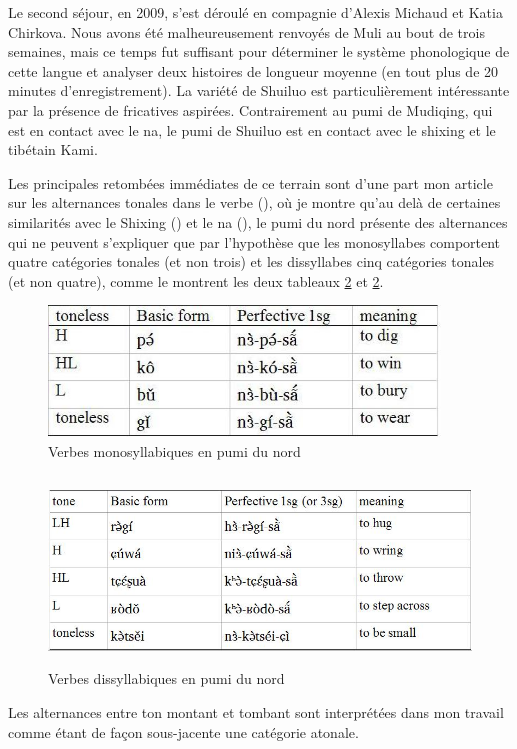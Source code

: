 \documentclass[oldfontcommands,oneside,a4paper,11pt]{memoir}
\begin{document}
Le second séjour, en 2009, s'est déroulé en compagnie d'Alexis Michaud et Katia Chirkova. Nous avons été malheureusement renvoyés de Muli au bout de trois semaines, mais ce temps fut suffisant pour déterminer le système phonologique de cette langue et analyser deux   histoires de longueur moyenne (en tout plus de 20 minutes d'enregistrement). La variété de Shuiluo est particulièrement intéressante par la présence de fricatives aspirées. Contrairement au pumi de Mudiqing, qui est en contact avec le na, le pumi de Shuiluo est en contact avec le shixing et le tibétain Kami.
 

Les principales retombées immédiates de ce terrain sont d'une part mon article sur les alternances tonales dans le verbe (\citealt{jacques11pumi.tone}), où je montre qu'au delà de certaines similarités avec le Shixing (\citealt{chirkova09tone}) et le na (\citealt{michaud08na}), le pumi du nord présente des alternances qui ne peuvent s'expliquer que par l'hypothèse que les monosyllabes comportent quatre catégories tonales (et non trois) et les dissyllabes cinq catégories tonales (et non quatre), comme le montrent les deux tableaux \ref{fig:pumi01} et \ref{fig:pumi01}.

\begin{figure}[h]
\centering
\includegraphics[height=35mm]{pumi01.jpg}
\caption{Verbes monosyllabiques en pumi du nord}
\label{fig:pumi01}
\end{figure}
\begin{figure}[h]
\centering
\includegraphics[height=50mm]{pumi02.jpg}
\caption{Verbes dissyllabiques en pumi du nord}
\label{fig:pumi01}
\end{figure}
Les alternances entre ton montant et tombant sont interprétées dans mon travail comme étant de façon sous-jacente une catégorie atonale.
\end{document}
